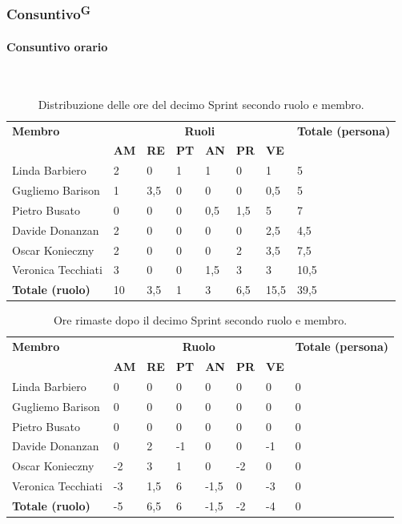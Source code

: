 \documentclass[8pt]{article}
\newcommand{\glossterm}[1]{#1\textsuperscript{G}} %
\newcommand{\subsubsubsection}[1]{\paragraph{#1}\mbox{}\\}
\begin{document}
\subsubsection{\glossterm{Consuntivo}}
\subsubsubsection{Consuntivo orario}
\begin{table}[ht!]
	\centering
	\begin{tabular}{p{4cm} *{6}{l} p{3cm}}
		\toprule
		\textbf{Membro} & \multicolumn{6}{c}{\textbf{Ruoli}} & \textbf{Totale
        (persona)}\\
		& \textbf{AM} & \textbf{RE} & \textbf{PT} & \textbf{AN} & \textbf{PR} & \textbf{VE}\\
		\midrule
        Linda Barbiero     & 2 & 0   & 1 & 1   & 0   & 1   & 5 \\  
        Gugliemo Barison   & 1 & 3,5 & 0 & 0   & 0   & 0,5 & 5 \\ 
        Pietro Busato      & 0 & 0   & 0 & 0,5 & 1,5 & 5   & 7 \\ 
        Davide Donanzan    & 2 & 0   & 0 & 0   & 0   & 2,5 & 4,5 \\ 
        Oscar Konieczny    & 2 & 0   & 0 & 0   & 2   & 3,5 & 7,5 \\ 
        Veronica Tecchiati & 3 & 0   & 0 & 1,5 & 3   & 3   & 10,5 \\ 
        \midrule
        \textbf{Totale (ruolo)} & 10 & 3,5 & 1 & 3 & 6,5 & 15,5 & 39,5 \\ 
		\bottomrule
	\end{tabular}
	\caption{Distribuzione delle ore del decimo Sprint secondo ruolo e membro.}
	\label{table:Distribuzione delle ore del decimo Sprint secondo ruolo e membro}
\end{table}
\begin{table}[ht!]
	\centering
	\begin{tabular}{p{4cm} p{1cm} p{1cm} p{1cm} p{1cm} p{1cm} p{1cm} p{3cm}}
		\toprule
        \textbf{Membro} & \multicolumn{6}{c}{\textbf{Ruolo}} & \textbf{Totale (persona)}\\
		& \textbf{AM} & \textbf{RE} & \textbf{PT} & \textbf{AN} & \textbf{PR} & \textbf{VE}\\
		\midrule
        Linda Barbiero & 0 & 0 & 0 & 0 & 0 & 0 & 0 \\ 
        Gugliemo Barison & 0 & 0 & 0 & 0 & 0 & 0 & 0 \\ 
        Pietro Busato & 0 & 0 & 0 & 0 & 0 & 0 & 0 \\ 
        Davide Donanzan & 0 & 2 & -1 & 0 & 0 & -1 & 0 \\ 
        Oscar Konieczny & -2 & 3 & 1 & 0 & -2 & 0 & 0 \\ 
        Veronica Tecchiati & -3 & 1,5 & 6 & -1,5 & 0 & -3 & 0 \\ 
        \midrule
        \textbf{Totale (ruolo)} & -5 & 6,5 & 6 & -1,5 &-2 & -4 & 0 \\
        \bottomrule
	\end{tabular}
	\caption{Ore rimaste dopo il decimo Sprint secondo ruolo e membro.}
	\label{table:Ore rimaste dopo il decimo Sprint secondo ruolo e membro}
\end{table}
\end{document}
